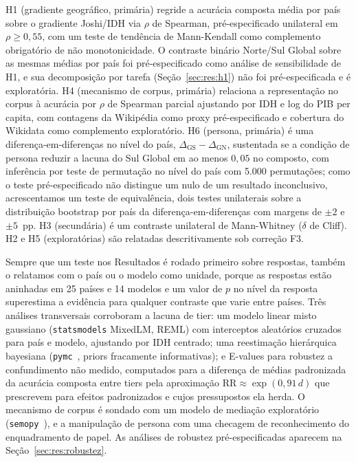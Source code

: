 H1 (gradiente geográfico, primária) regride a acurácia composta média por país
sobre o gradiente Joshi/IDH via $\rho$ de Spearman, pré-especificado unilateral
em $\rho\geq0,55$, com um teste de tendência de Mann-Kendall como complemento
obrigatório de não monotonicidade. O contraste binário Norte/Sul Global sobre
as mesmas médias por país foi pré-especificado como análise de sensibilidade de
H1, e sua decomposição por tarefa (Seção~\ref{sec:res:h1}) não foi
pré-especificada e é exploratória. H4 (mecanismo de corpus, primária) relaciona
a representação no corpus à acurácia por $\rho$ de Spearman parcial ajustando
por IDH e log do PIB per capita, com contagens da Wikipédia como proxy
pré-especificado e cobertura do Wikidata como complemento exploratório. H6
(persona, primária) é uma diferença-em-diferenças no nível do país,
$\Delta_{\mathrm{GS}}-\Delta_{\mathrm{GN}}$, sustentada se a condição de
persona reduzir a lacuna do Sul Global em ao menos $0,05$ no composto, com
inferência por teste de permutação no nível do país com 5.000 permutações; como
o teste pré-especificado não distingue um nulo de um resultado inconclusivo,
acrescentamos um teste de equivalência, dois testes unilaterais sobre a
distribuição bootstrap por país da diferença-em-diferenças com margens de
$\pm2$ e $\pm5$~pp. H3 (secundária) é um contraste unilateral de Mann-Whitney
($\delta$ de Cliff). H2 e H5 (exploratórias) são relatadas descritivamente sob
correção F3.

Sempre que um teste nos Resultados é rodado primeiro sobre respostas, também o
relatamos com o país ou o modelo como unidade, porque as respostas estão
aninhadas em 25 países e 14 modelos e um valor de $p$ no nível da resposta
superestima a evidência para qualquer contraste que varie entre países. Três
análises transversais corroboram a lacuna de tier: um modelo linear misto
gaussiano (\texttt{statsmodels} MixedLM, REML) com interceptos aleatórios
cruzados para país e modelo, ajustando por IDH centrado; uma reestimação
hierárquica bayesiana (\texttt{pymc}~\citep{pymc}, priors fracamente
informativas); e E-values para robustez a confundimento não medido, computados
para a diferença de médias padronizada da acurácia composta entre tiers pela
aproximação $\mathrm{RR}\approx\exp(0,91\,d)$ que \citet{vanderweele2017evalue}
prescrevem para efeitos padronizados e cujos pressupostos ela herda. O
mecanismo de corpus é sondado com um modelo de mediação exploratório
(\texttt{semopy}~\citep{semopy}), e a manipulação de persona com uma checagem de
reconhecimento do enquadramento de papel. As análises de robustez
pré-especificadas aparecem na Seção~\ref{sec:res:robustez}.

